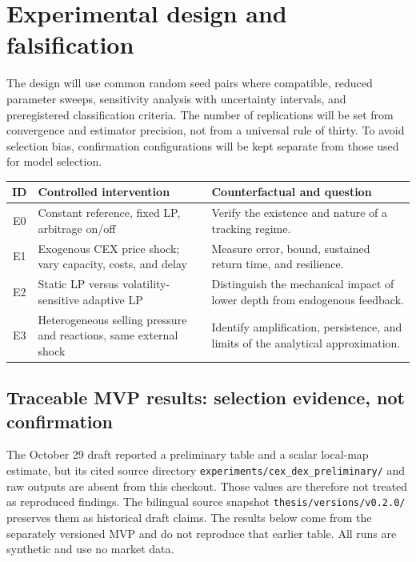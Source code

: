\section{Experimental design and falsification}

The design will use common random seed pairs where compatible, reduced parameter
sweeps, sensitivity analysis with uncertainty intervals, and preregistered
classification criteria. The number of replications will be set from convergence and
estimator precision, not from a universal rule of thirty. To avoid selection bias,
confirmation configurations will be kept separate from those used for model selection.

\begin{table}[!ht]
\centering
\small
\begin{tabularx}{\textwidth}{@{}c p{4.2cm} X@{}}
\toprule
\textbf{ID} & \textbf{Controlled intervention} & \textbf{Counterfactual and question} \\
\midrule
E0 & Constant reference, fixed LP, arbitrage on/off & Verify the existence and nature
  of a tracking regime. \\
E1 & Exogenous CEX price shock; vary capacity, costs, and delay & Measure error, bound,
  sustained return time, and resilience. \\
E2 & Static LP versus volatility-sensitive adaptive LP & Distinguish the mechanical
  impact of lower depth from endogenous feedback. \\
E3 & Heterogeneous selling pressure and reactions, same external shock & Identify
  amplification, persistence, and limits of the analytical approximation. \\
\bottomrule
\end{tabularx}
\end{table}

\subsection{Traceable MVP results: selection evidence, not confirmation}

The October 29 draft reported a preliminary table and a scalar local-map estimate, but
its cited source directory \texttt{experiments/cex\_dex\_preliminary/} and raw outputs
are absent from this checkout. Those values are therefore not treated as reproduced
findings. The bilingual source snapshot \texttt{thesis/versions/v0.2.0/} preserves
them as historical draft claims. The results below come from the separately versioned
MVP and do not reproduce that earlier table. All runs are synthetic and use no market
data.

